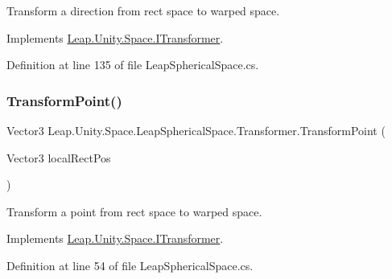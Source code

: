Transform a direction from rect space to warped space. 



Implements \mbox{\hyperlink{interface_leap_1_1_unity_1_1_space_1_1_i_transformer_a86883dfa18d51d4254dff56b1d9f5024}{Leap.\+Unity.\+Space.\+I\+Transformer}}.



Definition at line 135 of file Leap\+Spherical\+Space.\+cs.

\mbox{\label{class_leap_1_1_unity_1_1_space_1_1_leap_spherical_space_1_1_transformer_a6ff15b9de7a7ca000bb2a565642a815e}} 
\subsubsection{\texorpdfstring{TransformPoint()}{TransformPoint()}}
{\footnotesize\ttfamily Vector3 Leap.\+Unity.\+Space.\+Leap\+Spherical\+Space.\+Transformer.\+Transform\+Point (\begin{DoxyParamCaption}\item[{Vector3}]{local\+Rect\+Pos }\end{DoxyParamCaption})}



Transform a point from rect space to warped space. 



Implements \mbox{\hyperlink{interface_leap_1_1_unity_1_1_space_1_1_i_transformer_ad4ffef6002e74fe4967c4b7b9d5a5f74}{Leap.\+Unity.\+Space.\+I\+Transformer}}.



Definition at line 54 of file Leap\+Spherical\+Space.\+cs.

\mbox{\label{class_leap_1_1_unity_1_1_space_1_1_leap_spherical_space_1_1_transformer_a389407a7ecb746326153af8c11238250}} 
